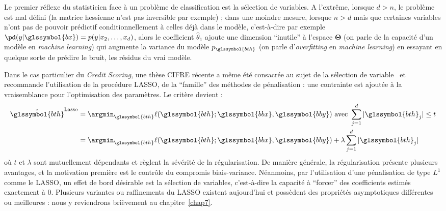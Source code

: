 Le premier réflexe du statisticien face à un problème de classification est la sélection de variables. A l'extrême, lorsque $d > n$, le problème est mal défini (la matrice hessienne n'est pas inversible par exemple) ; dans une moindre mesure, lorsque $n > d$ mais que certaines variables n'ont pas de pouvoir prédictif conditionnellement à celles déjà dans le modèle, c'est-à-dire par exemple $\pd(y | \glssymbol{bx}) = p(y|x_2,\dots,x_d)$, alors le coefficient $\hat{\theta}_1$ ajoute une dimension ``inutile'' à l'espace $\bm{\Theta}$ (on parle de la capacité d'un modèle en \textit{machine learning}) qui augmente la variance du modèle $p_{\glssymbol{bth}}$ (on parle d'\textit{overfitting} en \textit{machine learning}) en essayant en quelque sorte de prédire le bruit, les résidus du vrai modèle.



Dans le cas particulier du \textit{Credit Scoring}, une thèse CIFRE récente a même été consacrée au sujet de la sélection de variable~\cite{vital2016} et recommande l'utilisation de la procédure LASSO, de la ``famille'' des méthodes de pénalisation : une contrainte est ajoutée à la vraisemblance pour l'optimisation des paramètres. Le critère devient :
\begin{align*}
\hat{\glssymbol{bth}}^{\text{Lasso}} & = \argmin_{\glssymbol{bth}} \ell(\glssymbol{bth};\glssymbol{bbx},\glssymbol{bby}) \text{ avec } \sum_{j=1}^d |\glssymbol{bth}_j| \leq t \\
 & = \argmin_{\glssymbol{bth}}  \ell(\glssymbol{bth};\glssymbol{bbx},\glssymbol{bby}) + \lambda \sum_{j=1}^d |\glssymbol{bth}_j|
\end{align*}
où $t$ et $\lambda$ sont mutuellement dépendants et règlent la sévérité de la régularisation. De manière générale, la régularisation présente plusieurs avantages, et la motivation première est le contrôle du compromis biais-variance. Néanmoins, par l'utilisation d'une pénalisation de type $L^1$ comme le LASSO, un effet de bord désirable est la sélection de variables, c'est-à-dire la capacité à ``forcer'' des coefficients estimés exactement à $0$. Plusieurs variantes ou raffinements du LASSO existent aujourd'hui et possèdent des propriétés asymptotiques différentes ou meilleures : nous y reviendrons brièvement au chapitre~\ref{chap7}.


